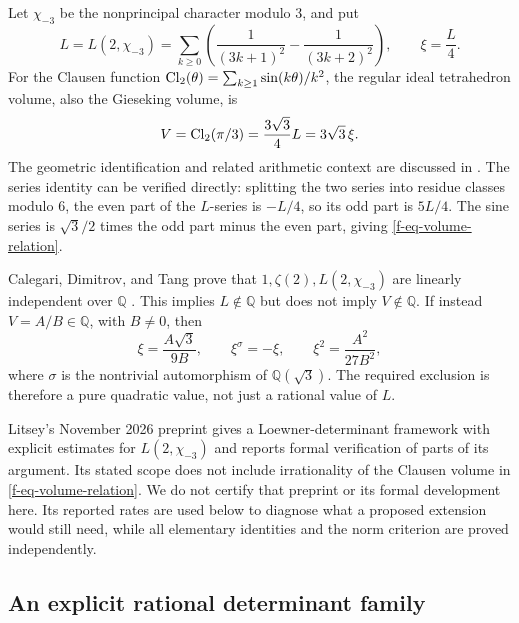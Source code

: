 \documentclass[11pt,a4paper]{article}
\theoremstyle{definition}
\theoremstyle{remark}
\begin{document}
Let $\chi_{-3}$ be the nonprincipal character modulo $3$, and put
\begin{equation}
 L=L(2,\chi_{-3})=
 \sum_{k\ge0}\left(\frac1{(3k+1)^2}-\frac1{(3k+2)^2}\right),
 \qquad \xi=\frac L4.
 \label{f-eq-l-constant}
\end{equation}
For the Clausen function
$\operatorname{Cl}_2(\theta)=\sum_{k\ge1}\sin(k\theta)/k^2$, the regular ideal
tetrahedron volume, also the Gieseking volume, is
\begin{equation}
 V=\operatorname{Cl}_2(\pi/3)=\frac{3\sqrt3}{4}L=3\sqrt3\,\xi.
 \label{f-eq-volume-relation}
\end{equation}
The geometric identification and related arithmetic context are discussed
in \cite{f-cdt}.  The series identity can be verified directly: splitting
the two series into residue classes modulo $6$, the even part of the
$L$-series is $-L/4$, so its odd part is $5L/4$.  The sine series is
$\sqrt3/2$ times the odd part minus the even part, giving
\eqref{f-eq-volume-relation}.

Calegari, Dimitrov, and Tang prove that $1,\zeta(2),L(2,\chi_{-3})$
are linearly independent over $\mathbb Q$ \cite{f-cdt}.  This implies
$L\notin\mathbb Q$ but does not imply $V\notin\mathbb Q$.  If instead
$V=A/B\in\mathbb Q$, with $B\ne0$, then
\begin{equation}
 \xi=\frac{A\sqrt3}{9B},\qquad
 \xi^\sigma=-\xi,\qquad
 \xi^2=\frac{A^2}{27B^2},
 \label{f-eq-pure-quadratic-target}
\end{equation}
where $\sigma$ is the nontrivial automorphism of $\mathbb Q(\sqrt3)$.
The required exclusion is therefore a pure quadratic value, not just a
rational value of $L$.

Litsey's November 2026 preprint \cite{f-litsey} gives a Loewner-determinant
framework with explicit estimates for $L(2,\chi_{-3})$ and reports formal
verification of parts of its argument.  Its stated scope does not include
irrationality of the Clausen volume in \eqref{f-eq-volume-relation}.
We do not certify that preprint or its formal development here.  Its
reported rates are used below to diagnose what a proposed extension would
still need, while all elementary identities and the norm criterion are
proved independently.

\subsection{An explicit rational determinant family}
\label{f-sub-determinant-family}
\end{document}
